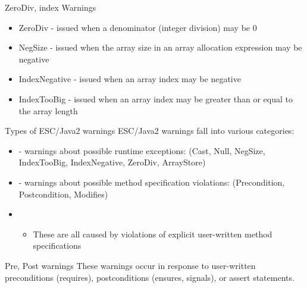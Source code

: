 \documentclass[
pdf,
nocolorBG,
slideColor,
cok,
]{prosper}
\begin{document}
\begin{slide}{ZeroDiv, index Warnings}
\vspace*{-6ex}
\begin{itemize}
\item {\knalblue ZeroDiv} - issued when a denominator (integer division) may be 0
\item {\knalblue NegSize} - issued when the array size in an array allocation expression may be negative
\item {\knalblue IndexNegative} - issued when an array index may be negative
\item {\knalblue IndexTooBig} - issued when an array index may be greater than or equal to the array length
\end{itemize}
{\tiny
\begin{figure*}

\end{figure*}
}
\end{slide}

\begin{slide}{Types of ESC/Java2 warnings}
\vspace*{-6ex}
ESC/Java2 warnings fall into various categories:
\begin{itemize}
\item[] - {\gray warnings about possible { runtime exceptions}:
(Cast, Null, NegSize, IndexTooBig, IndexNegative, ZeroDiv, ArrayStore)}

\item[] - warnings about possible method {\knalblue specification violations}:
(Precondition, Postcondition, Modifies)

\item[]
\begin{itemize}
\item These are all caused by violations of explicit user-written method specifications
\end{itemize}

\end{itemize}
\end{slide}
\begin{slide}{Pre, Post warnings}
\vspace*{-6ex}
These warnings occur in response to user-written preconditions (requires), postconditions (ensures, signals), or assert statements.

\begin{figure*}
\tiny

\end{figure*}
\end{slide}
\end{document}
